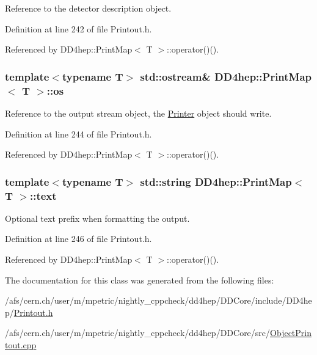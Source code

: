 Reference to the detector description object. 

Definition at line 242 of file Printout.h.

Referenced by DD4hep::PrintMap$<$ T $>$::operator()().\hypertarget{struct_d_d4hep_1_1_print_map_af89e40c312ce2cf93e6956d3d03b704b}{
\subsubsection[{os}]{\setlength{\rightskip}{0pt plus 5cm}template$<$typename T$>$ std::ostream\& {\bf DD4hep::PrintMap}$<$ {\bf T} $>$::{\bf os}}}
\label{struct_d_d4hep_1_1_print_map_af89e40c312ce2cf93e6956d3d03b704b}


Reference to the output stream object, the \hyperlink{struct_d_d4hep_1_1_printer}{Printer} object should write. 

Definition at line 244 of file Printout.h.

Referenced by DD4hep::PrintMap$<$ T $>$::operator()().\hypertarget{struct_d_d4hep_1_1_print_map_ad776e7ab0023498d02708495e5dd0b1c}{
\subsubsection[{text}]{\setlength{\rightskip}{0pt plus 5cm}template$<$typename T$>$ std::string {\bf DD4hep::PrintMap}$<$ {\bf T} $>$::{\bf text}}}
\label{struct_d_d4hep_1_1_print_map_ad776e7ab0023498d02708495e5dd0b1c}


Optional text prefix when formatting the output. 

Definition at line 246 of file Printout.h.

Referenced by DD4hep::PrintMap$<$ T $>$::operator()().

The documentation for this class was generated from the following files:\begin{DoxyCompactItemize}
\item 
/afs/cern.ch/user/m/mpetric/nightly\_\-cppcheck/dd4hep/DDCore/include/DD4hep/\hyperlink{_printout_8h}{Printout.h}\item 
/afs/cern.ch/user/m/mpetric/nightly\_\-cppcheck/dd4hep/DDCore/src/\hyperlink{_object_printout_8cpp}{ObjectPrintout.cpp}\end{DoxyCompactItemize}

